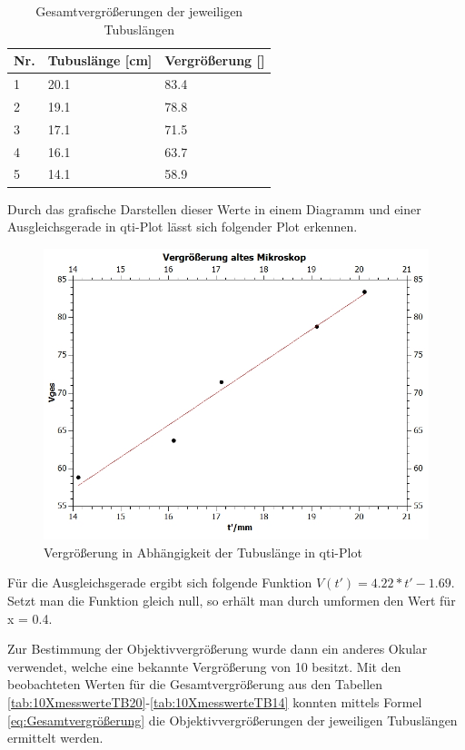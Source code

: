 \documentclass[12pt,a4paper,twoside]{article}
\begin{document}
\begin{table}[H]
    \centering
    \caption{Gesamtvergrößerungen der jeweiligen Tubuslängen}
    \label{tab:Gesamtvergrößerung}
    \begin{tabular}{| l | l | l |}
        \hline
        Nr.   & Tubuslänge [cm]  & Vergrößerung [] \\
        \hline
        1 & 20.1 & 83.4 \\
        2 & 19.1 & 78.8 \\
        3 & 17.1 & 71.5 \\
        4 & 16.1 & 63.7 \\
        5 & 14.1 & 58.9 \\
        \hline
    \end{tabular}
\end{table}

\noindent
Durch das grafische Darstellen dieser Werte in einem Diagramm und einer Ausgleichsgerade in qti-Plot lässt sich folgender Plot erkennen.

\begin{figure}[H]
    \centering
    \includegraphics[width=0.6\linewidth, angle=0]{nudes/VergrößerungAltesMikr.jpg}
    \caption{Vergrößerung in Abhängigkeit der Tubuslänge in qti-Plot}
    \label{fig:VergrößerungDiagramm}
\end{figure}

\noindent
Für die Ausgleichsgerade ergibt sich folgende Funktion $V(t') = 4.22*t' - 1.69$. Setzt man die Funktion gleich null, so erhält man durch umformen den Wert für x = 0.4. \newline

\noindent 
Zur Bestimmung der Objektivvergrößerung wurde dann ein anderes Okular verwendet, welche eine bekannte Vergrößerung von 10 besitzt. 
Mit den beobachteten Werten für die Gesamtvergrößerung aus den Tabellen \ref{tab:10XmesswerteTB20}-\ref{tab:10XmesswerteTB14} konnten mittels Formel \ref*{eq:Gesamtvergrößerung} die Objektivvergrößerungen der jeweiligen Tubuslängen ermittelt werden.
\end{document}
